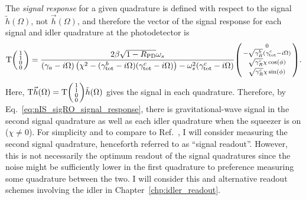 The \emph{signal response} for a given quadrature is defined with respect to the signal $\tilde h(\Omega)$, not $\vec h(\Omega)$, and therefore the vector of the signal response for each signal and idler quadrature at the photodetector is
\begin{equation}\label{eq:nIS_sigRO_signal_response}
\text{T}\begin{psmallmatrix}1 \\1\\0\\0\end{psmallmatrix} = \frac{2 \beta \sqrt{1-R_\text{PD}} \omega_s}{(\gamma_a-i \Omega ) \left(\chi ^2-(\gamma^b_\text{tot}-i\Omega) (\gamma^c_\text{tot}-i\Omega)\right)-\omega_s^2 (\gamma^c_\text{tot}-i \Omega )} \begin{psmallmatrix}0 \\-\sqrt{\gamma^b_R}(\gamma^c_\text{tot}-i\Omega)\\\sqrt{\gamma^c_R}\chi\cos(\phi)\\\sqrt{\gamma^c_R}\chi\sin(\phi)\end{psmallmatrix}.
\end{equation}
Here, $\text{T}\vec h(\Omega)=\text{T}\begin{psmallmatrix}1 \\1\\0\\0\end{psmallmatrix}\tilde h(\Omega)$ gives the signal in each quadrature.
Therefore, by Eq.~\ref{eq:nIS_sigRO_signal_response}, there is gravitational-wave signal in the second signal quadrature as well as each idler quadrature when the squeezer is on ($\chi\neq0$). For simplicity and to compare to Ref.~\cite{liBroadbandSensitivityImprovement2020}, I will consider measuring the second signal quadrature, henceforth referred to as ``signal readout''. However, this is not necessarily the optimum readout of the signal quadratures since the noise might be sufficiently lower in the first quadrature to preference measuring some quadrature between the two. I will consider this and alternative readout schemes involving the idler in Chapter~\ref{chp:idler_readout}.

